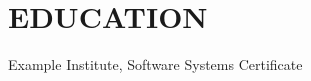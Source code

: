 \documentclass[main.tex]{subfiles}
\begin{document}
\section{EDUCATION} {
  \drawline
  Example Institute, Software Systems Certificate
}
\end{document}
